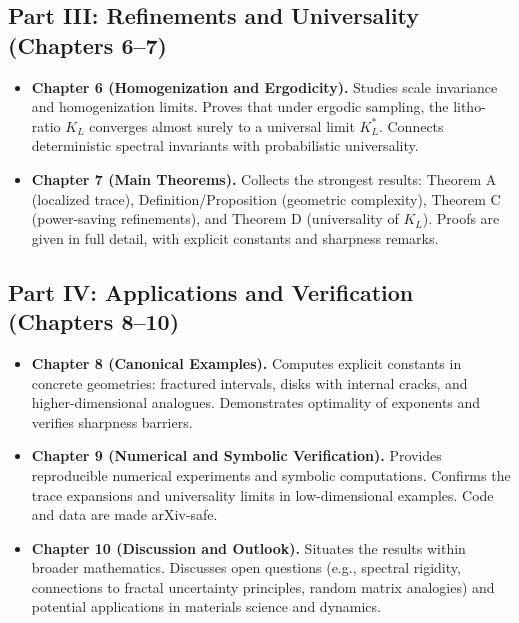 \subsection*{Part III: Refinements and Universality (Chapters 6–7)}

\begin{itemize}
  \item \textbf{Chapter 6 (Homogenization and Ergodicity).}  
  Studies scale invariance and homogenization limits. Proves that under
  ergodic sampling, the litho-ratio $K_L$ converges almost surely to a
  universal limit $K_L^*$. Connects deterministic spectral invariants
  with probabilistic universality.

  \item \textbf{Chapter 7 (Main Theorems).}  
  Collects the strongest results: Theorem A (localized trace),
  Definition/Proposition (geometric complexity), Theorem C (power-saving
  refinements), and Theorem D (universality of $K_L$). Proofs are given
  in full detail, with explicit constants and sharpness remarks.
\end{itemize}

\subsection*{Part IV: Applications and Verification (Chapters 8–10)}

\begin{itemize}
  \item \textbf{Chapter 8 (Canonical Examples).}  
  Computes explicit constants in concrete geometries: fractured intervals,
  disks with internal cracks, and higher-dimensional analogues.
  Demonstrates optimality of exponents and verifies sharpness barriers.

  \item \textbf{Chapter 9 (Numerical and Symbolic Verification).}  
  Provides reproducible numerical experiments and symbolic computations.
  Confirms the trace expansions and universality limits in low-dimensional
  examples. Code and data are made arXiv-safe.

  \item \textbf{Chapter 10 (Discussion and Outlook).}  
  Situates the results within broader mathematics. Discusses open
  questions (e.g., spectral rigidity, connections to fractal uncertainty
  principles, random matrix analogies) and potential applications in
  materials science and dynamics.
\end{itemize}

